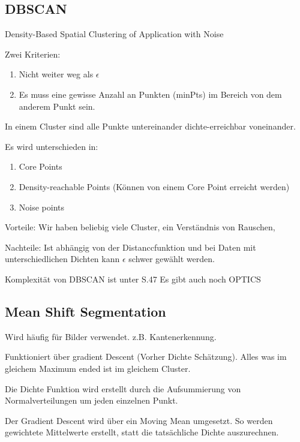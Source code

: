 \documentclass[a4paper]{article}
\begin{document}

\subsection{DBSCAN}

Density-Based Spatial Clustering of Application with Noise

Zwei Kriterien:

\begin{enumerate}
    \item Nicht weiter weg als $\epsilon$
    \item Es muss eine gewisse Anzahl an Punkten (minPts) im Bereich von dem anderem Punkt sein.
\end{enumerate}

In einem Cluster sind alle Punkte untereinander dichte-erreichbar voneinander.

Es wird unterschieden in:

\begin{enumerate}
    \item Core Points
    \item Density-reachable Points (Können von einem Core Point erreicht werden)
    \item Noise points
\end{enumerate}

Vorteile: Wir haben beliebig viele Cluster, ein Verständnis von Rauschen, 

Nachteile: Ist abhängig von der Distanccfunktion und bei Daten mit unterschiedlichen Dichten kann $\epsilon$ schwer gewählt werden.

Komplexität von DBSCAN ist unter S.47 Es gibt auch noch OPTICS

\subsection{Mean Shift Segmentation}

Wird häufig für Bilder verwendet. z.B. Kantenerkennung.

Funktioniert über gradient Descent (Vorher Dichte Schätzung). Alles was im gleichem Maximum ended ist im gleichem Cluster.

Die Dichte Funktion wird erstellt durch die Aufsummierung von Normalverteilungen um jeden einzelnen Punkt.

Der Gradient Descent wird über ein Moving Mean umgesetzt. So werden gewichtete Mittelwerte erstellt, statt die tatsächliche Dichte auszurechnen.
\end{document}
